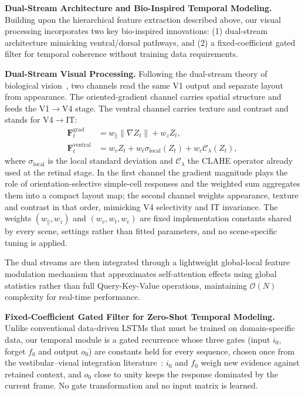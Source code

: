 \textbf{Dual-Stream Architecture and Bio-Inspired Temporal Modeling.} Building upon the hierarchical feature extraction described above, our visual processing incorporates two key bio-inspired innovations: (1) dual-stream architecture mimicking ventral/dorsal path\-ways, and (2) a fixed-coefficient gated filter for temporal coherence without training data requirements.

\textbf{Dual-Stream Visual Processing.}
Following the dual-stream theory of biological vision~\cite{Goodale1992, Mishkin1983}, two channels read the same V1 output and separate layout from appearance. The oriented-gradient channel carries spatial structure and feeds the V1$\rightarrow$V4 stage. The ventral channel carries texture and contrast and stands for V4$\rightarrow$IT:
\begin{align}
    \mathbf{F}^{\text{grad}}_t    & = w_{\parallel} \|\nabla Z_t\| + w_{z} Z_t, \\
    \mathbf{F}^{\text{ventral}}_t & = w_{v} Z_t + w_{t} \sigma_{\text{local}}(Z_t) + w_{c} \mathcal{C}_\lambda(Z_t),
\end{align}
where $\sigma_{\text{local}}$ is the local standard deviation and $\mathcal{C}_\lambda$ the CLAHE operator already used at the retinal stage. In the first channel the gradient magnitude plays the role of orientation-selective simple-cell responses and the weighted sum aggregates them into a compact layout map; the second channel weights appearance, texture and contrast in that order, mimicking V4 selectivity and IT invariance. The weights $(w_{\parallel},w_z)$ and $(w_v,w_t,w_c)$ are fixed implementation constants shared by every scene, settings rather than fitted parameters, and no scene-specific tuning is applied.

The dual streams are then integrated through a lightweight global-local feature modulation mechanism that approximates self-attention effects using global statistics rather than full Query-Key-Value operations, maintaining $\mathcal{O}(N)$ complexity for real-time per\-for\-mance.

\textbf{Fixed-Coefficient Gated Filter for Zero-Shot Temporal Modeling.}
Unlike conventional data-driven LSTMs that must be trained on domain-specific data, our temporal module is a gated recurrence whose three gates (input $i_0$, forget $f_0$ and output $o_0$) are constants held for every sequence, chosen once from the vestibular--visual integration literature~\cite{Angelaki2004, Cullen2012}: $i_0$ and $f_0$ weigh new evidence against retained context, and $o_0$ close to unity keeps the response dominated by the current frame. No gate transformation and no input matrix is learned.

